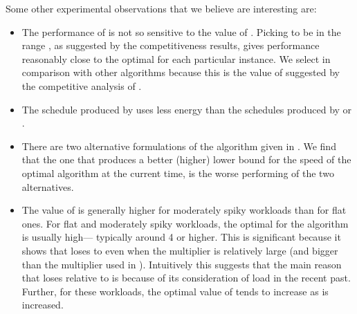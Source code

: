 \documentclass[11pt]{article}
\newcommand{\mycomment}[1]{ }
\begin{document}
Some other experimental observations that we believe are interesting are:
\begin{itemize}

\item 
The performance of  is not so sensitive to the value
of . Picking  to be in the range , as suggested
by the competitiveness results, gives performance reasonably close to the optimal 
for each particular instance.
We select  in comparison with other algorithms because this is the
value of  suggested by the competitive analysis of .

\item The schedule produced by   uses
less energy than the schedules produced by  or .


\item 
There are two alternative formulations of the algorithm  given
in \cite{BKP}. We find that the one that produces a better (higher) lower bound for
the speed of the optimal algorithm  at the current time, is the worse performing
of the two alternatives.

\item 
The value of  is generally higher for moderately spiky workloads than for flat
ones.  
For flat and moderately spiky workloads, the optimal  for the  algorithm is
usually high--- typically around 4 or higher.
This is significant because it shows that  loses to  even when the multiplier  is relatively
large (and bigger than the multiplier  used in ). Intuitively this suggests that the main
reason that  loses relative to  is because of its consideration of load in the recent past.
Further, for these workloads, the optimal value of  tends to increase as  is increased. 

\mycomment{
\item As  is increased, optimal  of  usually increases
  for flat and moderately spiky workloads. Optimal  is usually high
  - around 3 or higher - for both types of workload, and hence it is
  logical that optimal  does not go down, because using a smaller
   means that jobs preceding a spike would run slower, thus taking
  longer and forcing later jobs - which constitute a spike - to run
  much faster to be able to meet their deadlines, which consequently
  cause the workload to consume more energy. However, it is probably
  beneficial to increase  to allow the jobs preceding a spike to
  finish faster, thus giving more room, i.e. a longer time span, for
  later jobs to complete, and therefore enabling them to run at lower
  speeds; which can result in overall less energy consumption.
}


\end{itemize}
\end{document}
